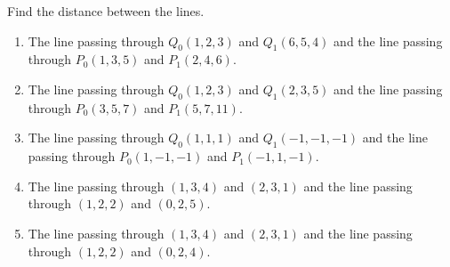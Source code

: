 Find the distance between the lines.

\begin{enumerate}[ref={\fcProblemRef}]
\item \label{problemDistanceLineLine(1,2,3)(6,5,4)to(1,3,5)(2,4,6)} The line passing through $Q_0(1,2,3) $ and $Q_1(6,5,4)$ and the line passing through $P_0(1,3,5)$ and $P_1(2,4,6)$.
\item The line passing through $Q_0(1,2,3) $ and $Q_1(2,3,5)$ and the line passing through $P_0(3,5,7)$ and $P_1(5,7,11)$.

\item The line passing through $ Q_0(1,1,1)$ and $Q_1(-1,-1,-1)$ and the line passing through $P_0(1, -1, -1)$ and $P_1(-1,1,-1)$.


\item \label{problemDistanceLineLine(1,3,4)(2,3,1)to(1,2,2)(0,2,5)}
The line passing through $ (1,3,4)$ and $(2,3,1)$ and the line passing through $(1,2,2)$ and $(0,2,5)$.


\item \label{problemDistanceLineLine(1,3,4)(2,3,1)to(1,2,2)(0,2,4)} The line passing through $ (1,3,4)$ and $(2,3,1)$ and the line passing through $(1,2,2)$ and $(0,2,4)$.

\end{enumerate}

\begin{comment}Calculator code solving one of above problems:
p0:=(3,5,7);
p1:=(5,7,11);
q0:=(1,2,3); 
q1:=(2,3,-5);
u1:=p1-p0;
u2:=q1-q0;
r:=q0-p0;
n:=u1\times u2;
((r n^t)_1)_1 /\sqrt{}(((n n^t)_1)_1) 
\end{comment}